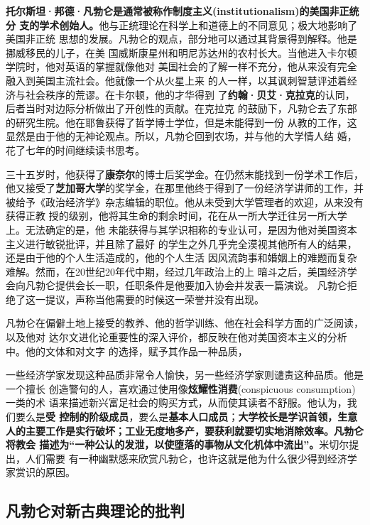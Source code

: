 \textbf{托尔斯坦·邦德·凡勃仑是通常被称作制度主义(institutionalism)的美国非正统分
  支的学术创始人。}他与正统理论在科学上和道德上的不同意见；极大地影响了美国非正统
思想的发展。凡勃仑的观点，部分地可以通过其背景得到解释。他是挪威移民的儿子，在美
国威斯康星州和明尼苏达州的农村长大。当他进入卡尔顿学院时，他对英语的掌握就像他对
美国社会的了解一样不充分，他从来没有完全融入到美国主流社会。他就像一个从火星上来
的人一样，以其讽刺智慧评述着经济与社会秩序的荒谬。在卡尔顿，他的才华得到
了\textbf{约翰·贝艾·克拉克}的认同，后者当时对边际分析做出了开创性的贡献。在克拉克
的鼓励下，凡勃仑去了东部的研究生院。他在耶鲁获得了哲学博士学位，但是未能得到一份
从教的工作，这显然是由于他的无神论观点。所以，凡勃仑回到农场，并与他的大学情人结
婚，花了七年的时间继续读书思考。

三十五岁时，他获得了\textbf{康奈尔}的博士后奖学金。在仍然末能找到一份学术工作后，
他又接受了\textbf{芝加哥大学}的奖学金，在那里他终于得到了一份经济学讲师的工作，并
被给予《政治经济学》杂志编辑的职位。他从未受到大学管理者的欢迎，从来没有获得正教
授的级别，他将其生命的剩余时间，花在从一所大学迁往另一所大学上。无法确定的是，他
未能获得与其学识相称的专业认可，是因为他对美国资本主义进行敏锐批评，并且除了最好
的学生之外几乎完全漠视其他所有人的结果，还是由于他的个人生活造成的，他的个人生活
因风流韵事和婚姻上的难题而复杂难解。然而，在20世纪20年代中期，经过几年政治上的上
暗斗之后，美国经济学会向凡勃仑提供会长一职，任职条件是他要加入协会并发表一篇演说。
凡勃仑拒绝了这一提议，声称当他需要的时候这一荣誉并没有出现。

凡勃仑在偏僻土地上接受的教养、他的哲学训练、他在社会科学方面的广泛阅读，以及他对
达尔文进化论重要性的深入评价，都反映在他对美国资本主义的分析中。他的文体和对文字
的选择，赋予其作品一种品质，

一些经济学家发现这种品质非常令人愉快，另一些经济学家则谴责这种品质。他是一个擅长
创造警句的人，喜欢通过使用像\textbf{炫耀性消费}(conspicuous consumption)一类的术
语来描述新兴富足社会的购买方式，从而使其读者不舒服。他认为，我们要么是\textbf{受
  控制的阶级成员}，要么是\textbf{基本人口成员}；\textbf{大学校长是学识首领，生意
  人的主要工作是实行破坏；工业无度地多产，要获利就要切实地消除效率。凡勃仑将教会
  描述为“一种公认的发泄，以使堕落的事物从文化机体中流出”。}米切尔提出，人们需要
有一种幽默感来欣赏凡勃仑，也许这就是他为什么很少得到经济学家赏识的原因。

\subsection{凡勃仑对新古典理论的批判}

